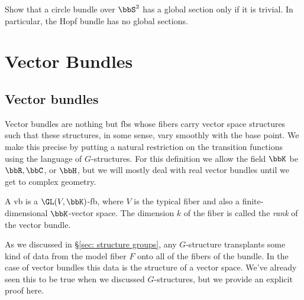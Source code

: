 \begin{xca}
    Show that a circle bundle over $\bbS^2$ has a global section only if it is trivial. In particular, the Hopf bundle has no global sections.
\end{xca}





\clearpage
\chapter{Vector Bundles}


\section{Vector bundles}\label{sec: vector bundles}

Vector bundles are nothing but \glspl{fb} whose fibers carry vector space structures such that these structures, in some sense, vary smoothly with the base point. We make this precise by putting a natural restriction on the transition functions using the language of $G$-structures. For this definition we allow the field $\bbK$ be $\bbR,\bbC$, or $\bbH$, but we will mostly deal with real vector bundles until we get to complex geometry.

\begin{defn}
    A \gls{vb} is a $\GL(V,\bbK)$-\gls{fb}, where $V$ is the typical fiber and also a finite-dimensional $\bbK$-vector space. The dimension $k$ of the fiber is called the \emph{rank} of the vector bundle.
\end{defn}

As we discussed in \S\ref{sec: structure groups}, any $G$-structure transplants some kind of data from the model fiber $F$ onto all of the fibers of the bundle. In the case of vector bundles this data is the structure of a vector space. We've already seen this to be true when we discussed $G$-structures, but we provide an explicit proof here.

